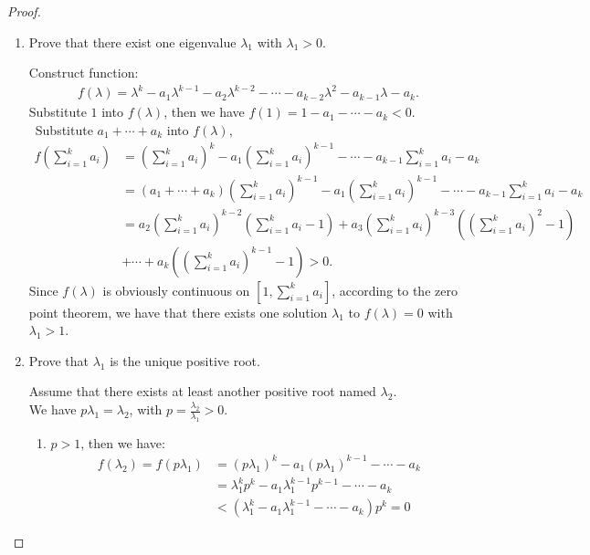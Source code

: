 \documentclass[12pt,a4]{article}
\begin{document}
\begin{proof} \quad
  \begin{enumerate}
    \item Prove that there exist one eigenvalue $\lambda_1$ with $\lambda_1 > 0$. \par
    Construct function:
    \begin{align*}
    f(\lambda) = \lambda^k - a_1  \lambda^{k-1} -a_2  \lambda^{k-2} - \cdots - a_{k-2} \lambda^2 - a_{k-1} \lambda - a_k.
    \end{align*}
    Substitute $1$ into $f(\lambda)$, then we have $f(1) = 1 - a_1 - \cdots - a_k < 0$. \
    Substitute $a_1 + \cdots + a_k$ into $f(\lambda)$,
    \begin{align*}
    f(\sum\limits_{i = 1}^ka_i) &= (\sum\limits_{i = 1}^ka_i)^k - a_1  (\sum\limits_{i = 1}^ka_i)^{k-1} - \cdots - a_{k-1} \sum\limits_{i = 1}^ka_i - a_k \\
    &= (a_1 + \cdots + a_k)(\sum\limits_{i = 1}^ka_i)^{k-1} - a_1  (\sum\limits_{i = 1}^ka_i)^{k-1} - \cdots - a_{k-1} \sum\limits_{i = 1}^ka_i - a_k \\
    &=a_2 (\sum\limits_{i = 1}^ka_i)^{k-2} (\sum\limits_{i = 1}^ka_i - 1) + a_3 (\sum\limits_{i = 1}^ka_i)^{k-3} ((\sum\limits_{i = 1}^ka_i)^2 - 1)  \\ 
    & + \cdots + a_k ((\sum\limits_{i = 1}^ka_i)^{k-1} - 1) > 0.
    \end{align*}
    Since $f(\lambda)$ is obviously continuous on $[1 , \sum\limits_{i = 1}^ka_i ]$, according to the zero point theorem, we have that there exists one solution $\lambda_1$ to $f(\lambda) = 0$ with $\lambda_1 > 1$.
    \item Prove that $\lambda_1$ is the unique positive root. \par
    Assume that there exists at least another positive root named $\lambda_2$. \\
    We have $p  \lambda_1 = \lambda_2$, with $p =  \frac{\lambda_2}{\lambda_1} > 0$.
    \begin{enumerate}
      \item $p > 1$, then we have:
      \begin{align*}
      f(\lambda_2) = f(p\lambda_1) &= (p\lambda_1)^k - a_1(p\lambda_1)^{k-1} - \cdots - a_k \\
      &= \lambda_1^k p^k - a_1 \lambda_1^{k-1} p^{k-1} - \cdots - a_k \\
      &< (\lambda_1^k - a_1 \lambda_1^{k-1} - \cdots - a_k) p^k = 0

\end{align*}
\end{enumerate}
\end{enumerate}
\end{proof}
\end{document}
